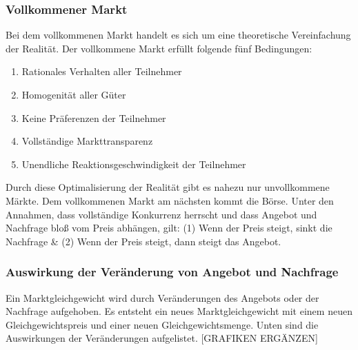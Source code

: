 \subsubsection{Vollkommener Markt}

Bei dem vollkommenen Markt handelt es sich um eine theoretische Vereinfachung der Realität. Der vollkommene Markt erfüllt folgende fünf Bedingungen:

\begin{enumerate}
\setlength\itemsep{0em}
	\item Rationales Verhalten aller Teilnehmer
	\item Homogenität aller Güter
	\item Keine Präferenzen der Teilnehmer
	\item Vollständige Markttransparenz
	\item Unendliche Reaktionsgeschwindigkeit der Teilnehmer
\end{enumerate}

Durch diese Optimalisierung der Realität gibt es nahezu nur unvollkommene Märkte. Dem vollkommenen Markt am nächsten kommt die Börse. Unter den Annahmen, dass vollständige Konkurrenz herrscht und dass Angebot und Nachfrage bloß vom Preis abhängen, gilt: (1) Wenn der Preis steigt, sinkt die Nachfrage \& (2) Wenn der Preis steigt, dann steigt das Angebot.

\subsubsection{Auswirkung der Veränderung von Angebot und Nachfrage}

Ein Marktgleichgewicht wird durch Veränderungen des Angebots oder der Nachfrage aufgehoben. Es entsteht ein neues Marktgleichgewicht mit einem neuen Gleichgewichtspreis und einer neuen Gleichgewichtsmenge. Unten sind die Auswirkungen der Veränderungen aufgelistet. [GRAFIKEN ERGÄNZEN]


